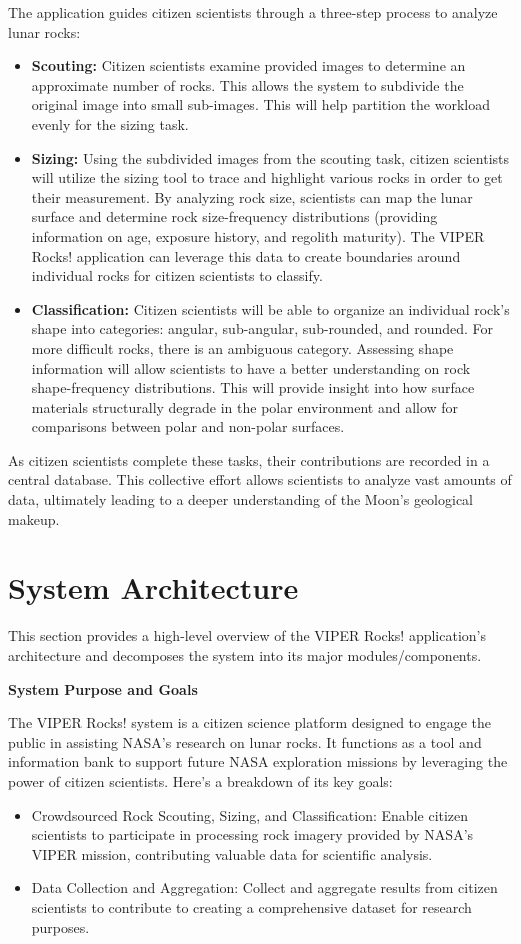 \documentclass{article}
\begin{document}
The application guides citizen scientists through a three-step process to analyze lunar rocks:
\begin{itemize}
	\item \textbf{Scouting:} Citizen scientists examine provided images to determine an approximate number of rocks. This allows the system to subdivide the original image into small sub-images. This will help partition the workload evenly for the sizing task.
	\item \textbf{Sizing:} Using the subdivided images from the scouting task, citizen scientists will utilize the sizing tool to trace and highlight various rocks in order to get their measurement. By analyzing rock size, scientists can map the lunar surface and determine rock size-frequency distributions (providing information on age, exposure history, and regolith maturity). The VIPER Rocks! application can leverage this data to create boundaries around individual rocks for citizen scientists to classify.
	\item \textbf{Classification:} Citizen scientists will be able to organize an individual rock’s shape into categories: angular, sub-angular, sub-rounded, and rounded. For more difficult rocks, there is an ambiguous category. Assessing shape information will allow scientists to have a better understanding on rock shape-frequency distributions. This will provide insight into how surface materials structurally degrade in the polar environment and allow for comparisons between polar and non-polar surfaces.
\end{itemize}
As citizen scientists complete these tasks, their contributions are recorded in a central database. This collective effort allows scientists to analyze vast amounts of data, ultimately leading to a deeper understanding of the Moon’s geological makeup.

\section{System Architecture}
This section provides a high-level overview of the VIPER Rocks! application’s architecture and decomposes the system into its major modules/components.

\textbf{System Purpose and Goals}

The VIPER Rocks! system is a citizen science platform designed to engage the public in assisting NASA's research on lunar rocks. It functions as a tool and information bank to support future NASA exploration missions by leveraging the power of citizen scientists. Here’s a breakdown of its key goals:
\begin{itemize}
	\item Crowdsourced Rock Scouting, Sizing, and Classification: Enable citizen scientists to participate in processing rock imagery provided by NASA’s VIPER mission, contributing valuable data for scientific analysis.
	\item Data Collection and Aggregation: Collect and aggregate results from citizen scientists to contribute to creating a comprehensive dataset for research purposes. 
\end{itemize}
\end{document}
